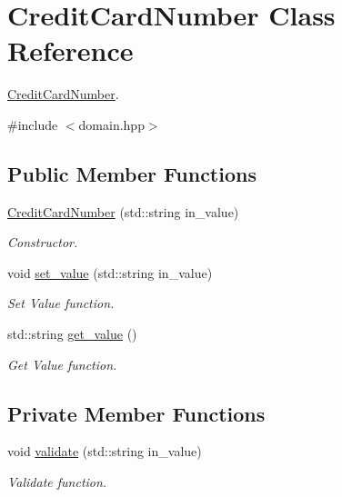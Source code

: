 \hypertarget{classCreditCardNumber}{}\section{Credit\+Card\+Number Class Reference}
\label{classCreditCardNumber}


\hyperlink{classCreditCardNumber}{Credit\+Card\+Number}.  




{\ttfamily \#include $<$domain.\+hpp$>$}

\subsection*{Public Member Functions}
\begin{DoxyCompactItemize}
\item 
\hyperlink{classCreditCardNumber_ac54faa5140051048b7ef59c3475f08bc}{Credit\+Card\+Number} (std\+::string in\+\_\+value)
\begin{DoxyCompactList}\small\item\em Constructor. \end{DoxyCompactList}\item 
void \hyperlink{classCreditCardNumber_ae54b7c422f816c05027b8dd70750b82d}{set\+\_\+value} (std\+::string in\+\_\+value)
\begin{DoxyCompactList}\small\item\em Set Value function. \end{DoxyCompactList}\item 
std\+::string \hyperlink{classCreditCardNumber_a3013b29d051a56fa79ca821bcc1f7d50}{get\+\_\+value} ()
\begin{DoxyCompactList}\small\item\em Get Value function. \end{DoxyCompactList}\end{DoxyCompactItemize}
\subsection*{Private Member Functions}
\begin{DoxyCompactItemize}
\item 
void \hyperlink{classCreditCardNumber_ad72572475b0bc3230dd21a7f8c3ac5e2}{validate} (std\+::string in\+\_\+value)
\begin{DoxyCompactList}\small\item\em Validate function. \end{DoxyCompactList}\end{DoxyCompactItemize}
